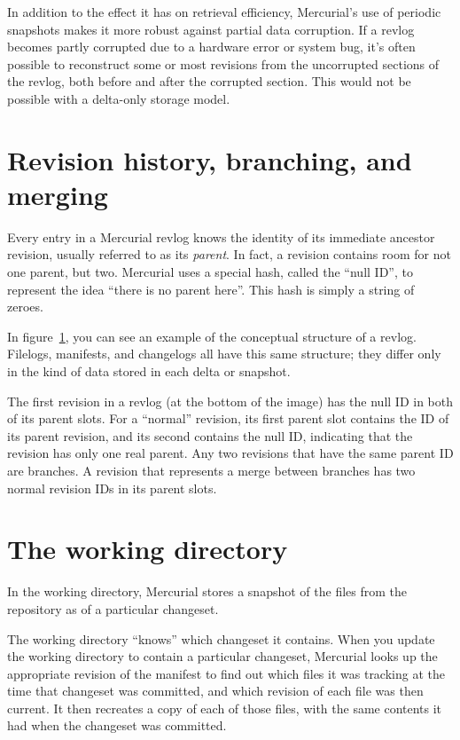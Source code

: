 In addition to the effect it has on retrieval efficiency, Mercurial's
use of periodic snapshots makes it more robust against partial data
corruption.  If a revlog becomes partly corrupted due to a hardware
error or system bug, it's often possible to reconstruct some or most
revisions from the uncorrupted sections of the revlog, both before and
after the corrupted section.  This would not be possible with a
delta-only storage model.

\section{Revision history, branching,
  and merging}

Every entry in a Mercurial revlog knows the identity of its immediate
ancestor revision, usually referred to as its \emph{parent}.  In fact,
a revision contains room for not one parent, but two.  Mercurial uses
a special hash, called the ``null ID'', to represent the idea ``there
is no parent here''.  This hash is simply a string of zeroes.

In figure~\ref{fig:concepts:revlog}, you can see an example of the
conceptual structure of a revlog.  Filelogs, manifests, and changelogs
all have this same structure; they differ only in the kind of data
stored in each delta or snapshot.

The first revision in a revlog (at the bottom of the image) has the
null ID in both of its parent slots.  For a ``normal'' revision, its
first parent slot contains the ID of its parent revision, and its
second contains the null ID, indicating that the revision has only one
real parent.  Any two revisions that have the same parent ID are
branches.  A revision that represents a merge between branches has two
normal revision IDs in its parent slots.

\begin{figure}[ht]
  \centering
  \caption{}
  \label{fig:concepts:revlog}
\end{figure}

\section{The working directory}

In the working directory, Mercurial stores a snapshot of the files
from the repository as of a particular changeset.

The working directory ``knows'' which changeset it contains.  When you
update the working directory to contain a particular changeset,
Mercurial looks up the appropriate revision of the manifest to find
out which files it was tracking at the time that changeset was
committed, and which revision of each file was then current.  It then
recreates a copy of each of those files, with the same contents it had
when the changeset was committed.

